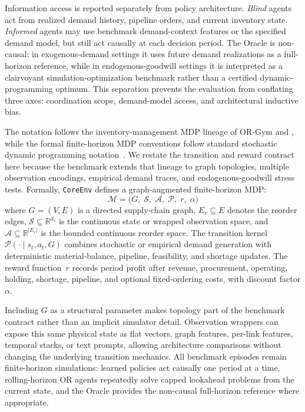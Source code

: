 \documentclass[10pt,a4paper]{article}
\begin{document}
Information access is reported separately from policy architecture.
\emph{Blind} agents act from realized demand history, pipeline orders,
and current inventory state. \emph{Informed} agents may use benchmark
demand-context features or the specified demand model, but still act
causally at each decision period. The Oracle is non-causal: in
exogenous-demand settings it uses future demand realizations as a
full-horizon reference, while in endogenous-goodwill settings it is
interpreted as a clairvoyant simulation-optimization benchmark rather
than a certified dynamic-programming optimum. This separation prevents
the evaluation from conflating three axes: coordination scope,
demand-model access, and architectural inductive bias.

The notation follows the inventory-management MDP lineage of
OR-Gym and \citet{hubbs2020,perez2021}, while the formal
finite-horizon MDP conventions follow standard stochastic dynamic
programming notation~\citep{puterman1994}. We restate the transition and
reward contract here because the benchmark extends that lineage to graph
topologies, multiple observation encodings, empirical demand traces, and
endogenous-goodwill stress tests. Formally,
\texttt{CoreEnv} defines a graph-augmented finite-horizon MDP:
\begin{equation}\label{eq:mdp}
  \mathcal{M} = \bigl(G,\; \mathcal{S},\; \mathcal{A},\;
                       \mathcal{P},\; r,\; \alpha\bigr)
\end{equation}
where $G=(V,E)$ is a directed supply-chain graph, $E_r\subseteq E$
denotes the reorder edges, $\mathcal{S}\subseteq\mathbb{R}^{d_s}$ is
the continuous state or wrapped observation space, and
$\mathcal{A}\subseteq\mathbb{R}^{|E_r|}$ is the bounded continuous
reorder space. The transition kernel
$\mathcal{P}(\cdot\mid s_t,a_t,G)$ combines stochastic or empirical
demand generation with deterministic material-balance, pipeline,
feasibility, and shortage updates. The reward function~$r$ records
period profit after revenue, procurement, operating, holding, shortage,
pipeline, and optional fixed-ordering costs, with discount factor
$\alpha$.

Including $G$ as a structural parameter makes topology part of the
benchmark contract rather than an implicit simulator detail. Observation
wrappers can expose this same physical state as flat vectors, graph
features, per-link features, temporal stacks, or text prompts, allowing
architecture comparisons without changing the underlying transition
mechanics. All benchmark episodes remain finite-horizon simulations:
learned policies act causally one period at a time, rolling-horizon OR
agents repeatedly solve capped lookahead problems from the current
state, and the Oracle provides the non-causal full-horizon reference
where appropriate.
\end{document}
